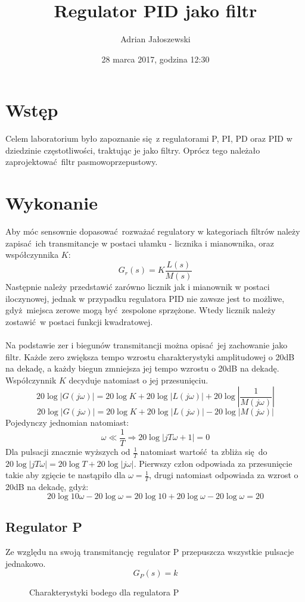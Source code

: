 \documentclass[a4paper, 10pt]{article}
\title{Regulator PID jako filtr}
\author{Adrian Jałoszewski}
\date{28 marca 2017, godzina 12:30}
\begin{document}
	\lstset{language=Python, basicstyle=\footnotesize,
		keepspaces=true,frame=single,tabsize=4}
	\maketitle
	\section{Wstęp}
		Celem laboratorium było zapoznanie się z regulatorami P, PI, PD oraz PID w dziedzinie częstotliwości, traktując je jako filtry. Oprócz tego należało zaprojektować filtr pasmowoprzepustowy.
	\section{Wykonanie}
		Aby móc sensownie dopasować rozważać regulatory w kategoriach filtrów należy zapisać ich transmitancje w postaci ułamku - licznika i mianownika, oraz współczynnika $K$:
		$$
			G_r(s) = K\frac{L(s)}{M(s)}
		$$
		Następnie należy przedstawić zarówno licznik jak i mianownik w postaci iloczynowej, jednak w przypadku regulatora PID nie zawsze jest to możliwe, gdyż miejsca zerowe mogą być zespolone sprzężone. Wtedy licznik należy zostawić w postaci funkcji kwadratowej. 
		\\
		\\
		Na podstawie zer i biegunów transmitancji można opisać jej zachowanie jako filtr. Każde zero zwiększa tempo wzrostu charakterystyki amplitudowej o 20dB na dekadę, a każdy biegun zmniejsza jej tempo wzrostu o 20dB na dekadę. Współczynnik $K$ decyduje natomiast o jej przesunięciu.
		$$
			20 \log |G(j\omega)| = 20 \log K + 20 \log |L(j\omega)| + 20 \log \left|\frac{1}{M(j\omega)}\right|
		$$
		$$
			20 \log |G(j\omega)| =  20 \log K + 20 \log |L(j\omega)| - 20 \log \left|M(j\omega)\right|
		$$ 
		Pojedynczy jednomian natomiast:
		$$
			\omega \ll \frac{1}{T} \Rightarrow 20 \log |jT\omega + 1| = 0 
		$$
		Dla pulsacji znacznie wyższych od $\frac{1}{T}$ natomiast wartość ta zbliża się do \linebreak $20 \log |jT\omega| = 20\log T + 20 \log |j\omega|$. Pierwszy człon odpowiada za przesunięcie takie aby zgięcie te nastąpiło dla $\omega = \frac{1}{T}$, drugi natomiast odpowiada za wzrost o 20dB na dekadę, gdyż: 
		$$
			20\log 10\omega - 20\log \omega = 20 \log 10 + 20 \log \omega - 20 \log \omega = 20
		$$
		\newpage
		\subsection{Regulator P}
			Ze względu na swoją transmitancję regulator P przepuszcza wszystkie pulsacje jednakowo.
			$$
				G_P(s) = k
			$$
			\begin{figure}[H]
				\centering
				\def \svgwidth{0.7\columnwidth}
				
				\caption{Charakterystyki bodego dla regulatora P}
			\end{figure}\noindent
\end{document}
